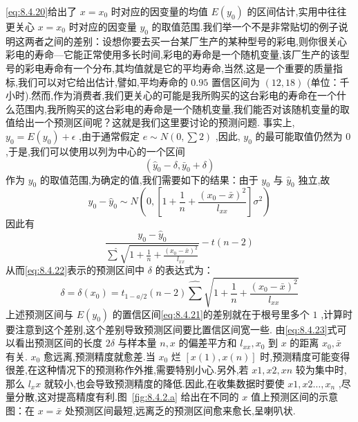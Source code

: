 \ref{eq:8.4.20}给出了 $x=x_0$ 时对应的因变量的均值 $E(y_0)$ 的区间估计,实用中往往更关心 $x=x_0$ 时对应的因变量 $y_0$ 的取值范围.我们举一个不是非常贴切的例子说明这两者之间的差别：设想你要去买一台某厂生产的某种型号的彩电,则你很关心彩电的寿命—它能正常使用多长时间,彩电的寿命是一个随机变量,该厂生产的该型号的彩电寿命有一个分布,其均值就是它的平均寿命,当然,这是一个重要的质量指标,我们可以对它给出估计,譬如,平均寿命的 $0.95$ 置信区间为 $(12,18)$ (单位：千小时).然而,作为消费者,我们更关心的可能是我所购买的这台彩电的寿命在一个什么范围内,我所购买的这台彩电的寿命是一个随机变量,我们能否对该随机变量的取值给出一个预测区间呢？这就是我们这里要讨论的预测问题.
事实上, $y_0=E(y_0)+\epsilon$ ,由于通常假定 $e\sim N(0,\sum 2)$ ,因此, $y_0$ 的最可能取值仍然为 $0$ ,于是,我们可以使用以列为中心的一个区间
\begin{equation}
\left( \widehat{y}_0-\delta ,\bar{y}_0+\delta \right) 
\end{equation}
作为 $y_0$ 的取值范围,为确定的值,我们需要如下的结果：由于 $y_0$ 与 $\hat{y}_0$ 独立,故
\begin{equation}
y_{0}-\hat{y}_{0} \sim N\left(0,\left[1+\frac{1}{n}+\frac{\left(x_{0}-\bar{x}\right)^{2}}{l_{x x}}\right] \sigma^{2}\right)
\end{equation}
因此有
\begin{equation}
\frac{y_{0}-\hat{y}_{0}}{\hat{\sum} \sqrt{1+\frac{1}{n}+\frac{\left(x_{0}-\bar{x}\right)^{2}}{l_{x x}}}}-t(n-2)
\end{equation}
从而\ref{eq:8.4.22}表示的预测区间中 $\delta$ 的表达式为：
\begin{equation}
\delta=\delta\left(x_{0}\right)=t_{1-a / 2}(n-2) \hat{\sum} \sqrt{1+\frac{1}{n}+\frac{\left(x_{0}-\bar{x}\right)^{2}}{l_{x x}}}\label{eq:8.4.23}
\end{equation}
上述预测区间与 $E(y_0)$ 的置信区间\ref{eq:8.4.21}的差别就在于根号里多个 $1$ ,计算时要注意到这个差别,这个差别导致预测区间要比置信区间宽一些.
由\ref{eq:8.4.23}式可以看出预测区间的长度 $2\delta$ 与样本量 $n,x$ 的偏差平方和 $l_{xx},x_0$ 到 $x$ 的距离 $x_0,\bar{x}$ 有关. $x_0$ 愈远离,预测精度就愈差.当 $x_0$ 烂 $[x(1),x(n)]$ 时,预测精度可能变得很差,在这种情况下的预测称作外推,需要特别小心.另外,若 $x1,x2,xn$ 较为集中时,那么 $l_xx$ 就较小,也会导致预测精度的降低.因此,在收集数据时要使 $x1,x2…,x_n$ ,尽量分散,这对提高精度有利.图~\ref{fig:8.4.2.a}
给出在不同的 $x$ 值上预测区间的示意图：在 $x=\bar{x}$ 处预测区间最短,远离乏的预测区间愈来愈长,呈喇叭状.

